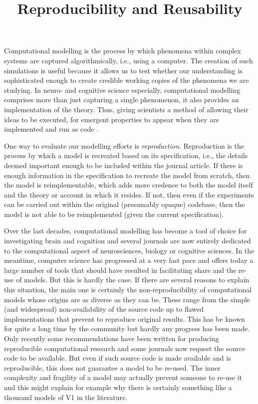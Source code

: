 \documentclass[jou]{apa6}
\title{Reproducibility and Reusability}
\begin{document}
\maketitle

Computational modelling is the process by which phenomena within complex systems are captured algorithmically, i.e., using a computer.
The creation of such simulations is useful because it allows us to test whether our understanding is sophisticated enough to create credible working copies of the phenomena we are studying.
In neuro- and cognitive science especially, computational modelling comprises more than just capturing a single phenomenon, it also provides an implementation of the theory.
Thus, giving scientists a method of allowing their ideas to be executed, for emergent properties to appear when they are implemented and run as code \cite{mcclelland09}.

One way to evaluate our modelling efforts is \emph{reproduction}.
Reproduction is the process by which a model is recreated based on its specification, i.e., the details deemed important enough to be included within the journal article.
If there is enough information in the specification to recreate the model  from scratch, then the model is reimplementable, which adds more credence to both the model itself and the theory or account in which it resides. If not, then even if the experiments can be carried out within the original (presumably opaque) codebase, then the model is not able to be reimplemented (given the current specification). 



Over the last decades, computational modelling has become a tool of choice for investigating brain and cognition and several journals are now entirely dedicated to the computational aspect of neurosciences, biology or cognitive sciences. In the meantime, computer science has progressed at a very fast pace and offers today a large number of tools that should have resulted in facilitating share and the re-use of models. But this is hardly the case. If there are several reasons to explain this situation, the main one is certainly the non-reproducibility of computational models whose origins are as diverse as they can be. These range from the simple (and widespread) non-availability of the source code up to flawed implementations that prevent to reproduce original results. This has be known for quite a long time by the community but hardly any progress has been made. Only recently some recommendations have been written for producing reproducible computational research and some journals now request the source code to be available. But even if such source code is made available and is reproducible, this does not guarantee a model to be re-used. The inner complexity and fragility of a model may actually prevent someone to re-use it and this might explain for example why there is certainly something like a thousand models of V1 in the literature.






\hspace*{1cm}
\end{document}
